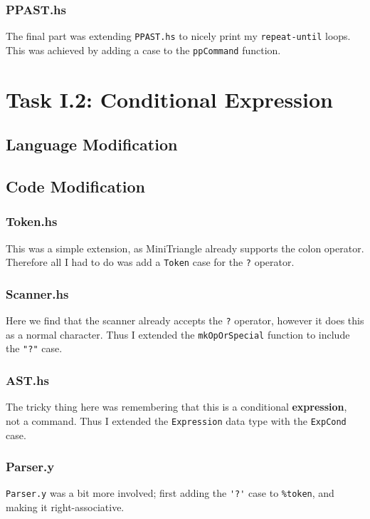 \documentclass[12pt]{article}
\newcommand{\lstin}[3]{%
  
}
\begin{document}
\lstin{130}{131}{Parser.y}

\subsubsection{PPAST.hs}
The final part was extending \verb|PPAST.hs| to nicely print my \verb|repeat-until| loops.
This was achieved by adding a case to the \verb|ppCommand| function.

\lstin{73}{76}{PPAST.hs}

\section{Task I.2: Conditional Expression}
\subsection{Language Modification}

\subsection{Code Modification}
\subsubsection{Token.hs}
This was a simple extension, as MiniTriangle already supports the colon operator. 
Therefore all I had to do was add a \verb|Token| case for the \verb|?| operator.

\lstin{33}{33}{Token.hs}

\subsubsection{Scanner.hs}
Here we find that the scanner already accepts the \verb|?| operator, however it does this as a normal character. 
Thus I extended the \verb|mkOpOrSpecial| function to include the \verb|"?"| case.

\lstin{132}{132}{Scanner.hs}

\subsubsection{AST.hs}
The tricky thing here was remembering that this is a conditional \textbf{expression}, not a command. 
Thus I extended the \verb|Expression| data type with the \verb|ExpCond| case.

\lstin{162}{167}{AST.hs}

\subsubsection{Parser.y}
\verb|Parser.y| was a bit more involved; first adding the \verb|'?'| case to \verb|%token|, and making it right-associative.
\end{document}
